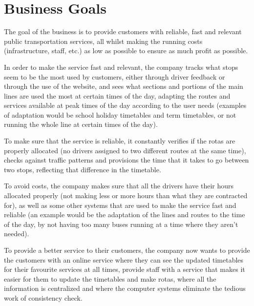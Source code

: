 \section{Business Goals}

The goal of the business is to provide customers with reliable, fast
and relevant public transportation services, all whilst making the
running costs (infrastructure, staff, etc.) as low as possible to
ensure as much profit as possible.

\medskip

In order to make the service fast and relevant, the company tracks
what stops seem to be the most used by customers, either through
driver feedback or through the use of the website, and sees what
sections and portions of the main lines are used the most at certain
times of the day, adapting the routes and services available at peak
times of the day according to the user needs (examples of adaptation
would be school holiday timetables and term timetables, or not
running the whole line at certain times of the day).

\medskip

To make sure that the service is reliable, it constantly verifies if
the rotas are properly allocated (no drivers assigned to two
different routes at the same time), checks against traffic patterns
and provisions the time that it takes to go between two stops,
reflecting that difference in the timetable.

\medskip

To avoid costs, the company makes sure that all the drivers have
their hours allocated properly (not making less or more hours than
what they are contracted for), as well as some other systems that
are used to make the service fast and reliable (an example would be
the adaptation of the lines and routes to the time of the day, by
not having too many buses running at a time where they aren't
needed).

\medskip

To provide a better service to their customers, the company now
wants to provide the customers with an online service where they can
see the updated timetables for their favourite services at all
times, provide staff with a service that makes it easier for them to
update the timetables and make rotas, where all the information is
centralized and where the computer systems eliminate the tedious
work of consistency check.
